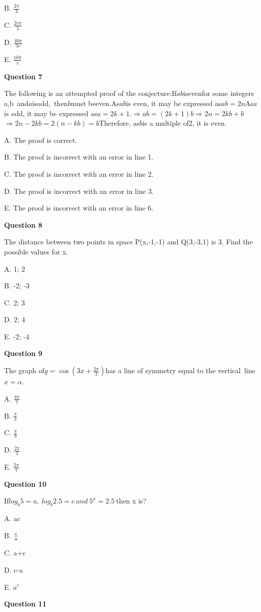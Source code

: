 B. \(\frac{2\pi}{3}\)

C. \(\frac{2v\pi}{5}\)

D. \(\frac{40\pi}{3v}\)

E. \(\frac{10\pi}{v}\)


\textbf{Question 7}

The following is an attempted proof of the conjecture:If\(ab\)isevenfor some integers a,b and\(a\)isodd, then\(b\)must beeven.As\(ab\)is even, it may be expressed as\(ab=2n\)As\(a\)is odd, it may be expressed as\(a = 2k + 1\).\(\Rightarrow ab=(2k+1)b\)\(\Rightarrow2n=2kb+b\)\(\Rightarrow2n-2kb=2(n-kb)=b\)Therefore, as\(b\)is a multiple of\(2\), it is even.

A. The proof is correct.

B. The proof is incorrect with an error in line 1.

C. The proof is incorrect with an error in line 2.

D. The proof is incorrect with an error in line 3.

E. The proof is incorrect with an error in line 6.


\textbf{Question 8}

The distance between two points in space P(x,-1,-1) and Q(3,-3,1) is 3. Find the possible values for x.

A. 1; 2

B. -2; -3

C. 2; 3

D. 2; 4

E. -2; -4


\textbf{Question 9}

The graph of\(y=\cos(3x+\frac{2\pi}{3})\)has a line of symmetry equal to the vertical line\(x=\alpha\).

A. \(\frac{4\pi}{7}\)

B. \(\frac{\pi}{3}\)

C. \(\frac{\pi}{9}\)

D. \(\frac{2\pi}{3}\)

E. \(\frac{2\pi}{7}\)


\textbf{Question 10}

If\({log}_b5=a,\ {log}_b2.5=c\ and{\ 5}^x=2.5\ \)then x is?

A. ac

B. \(c\over a\)

C. a+c

D. c-a

E. \(a^c\)


\textbf{Question 11}

